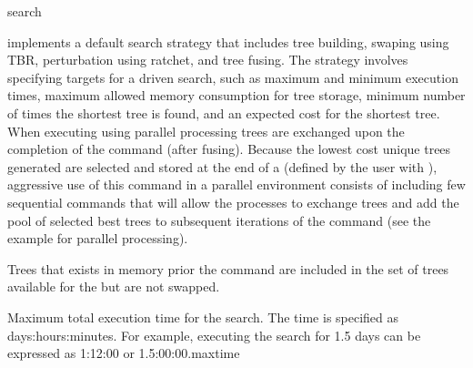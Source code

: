 \begin{command}{search}{}


	\begin{poydescription}
             implements a default search strategy that
            includes tree building, swaping using TBR, perturbation using
            ratchet, and tree fusing. The strategy involves specifying targets for 
            a driven search, such as maximum and minimum execution times, 
            maximum allowed memory consumption for tree storage, minimum number of times the
            shortest tree is found, and an expected cost for the shortest tree.  When executing
              using parallel processing trees are exchanged upon the
              completion of the command (after fusing).  Because the lowest cost unique trees 
              generated are selected and stored at the end of a  
              (defined by the user with ), aggressive use of this 
              command in a parallel environment consists of including few sequential
                commands that will allow the processes to
               exchange trees and add the pool of selected
               best trees to subsequent iterations of the command (see the example for parallel processing).

               Trees that exists in memory prior the  command
               are included in the set of trees available for the
                but are not swapped.
	\end{poydescription}

	\begin{arguments}


        	      
        
        {Maximum total execution time for the search. The time is specified as
        days:hours:minutes. For example, executing the search for 1.5 days can
        be expressed as 1:12:00 or 1.5:00:00.}{maxtime}
        

\end{arguments}
\end{command}
